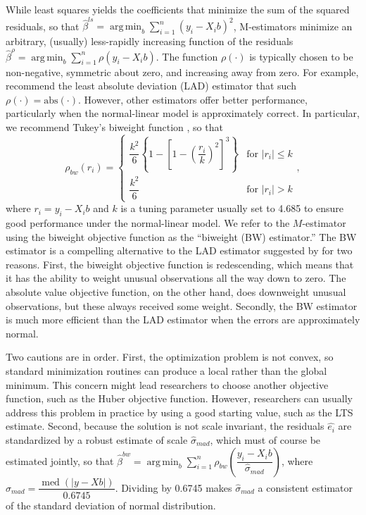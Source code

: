 \documentclass[12pt]{article}
\DeclareMathOperator*{\argmin}{arg\,min}
\DeclareMathOperator{\med}{med}
\begin{document}
While least squares yields the coefficients that minimize the sum of the squared residuals, so that $\hat{\beta}^{ls} =\argmin_{b} \sum_{i = 1}^n (y_i - X_ib)^2$, M-estimators minimize an arbitrary, (usually) less-rapidly increasing function of the residuals $\hat{\beta}^{\rho} =\argmin_{b} \sum_{i = 1}^n \rho(y_i - X_ib)$. 
The function $\rho(\cdot)$ is typically chosen to be non-negative, symmetric about zero, and increasing away from zero. 
For example, \cite{HardenDesmarais2011} recommend the least absolute deviation (LAD) estimator \citep{Dodge1987} that such $\rho(\cdot) = \text{abs}(\cdot)$. 
However, other estimators offer better performance, particularly when the normal-linear model is approximately correct. 
In particular, we recommend Tukey's biweight function \citep{BeatonTukey1974}, so that
\begin{displaymath}
   \rho_{bw}(r_i) = \left\{
     \begin{array}{lr}
       \dfrac{k^2}{6}\left\{ 1 - \left[ 1 - \left( \dfrac{r_i}{k} \right)^2 \right]^3\right\} & \text{for } |r_i| \leq k\\
        \dfrac{k^2}{6} & \text{for } |r_i| > k 
\end{array}
   \right.,
\end{displaymath}
\noindent where $r_i = y_i - X_ib$ and $k$ is a tuning parameter usually set to 4.685 to ensure good performance under the normal-linear model. 
We refer to the $M$-estimator using the biweight objective function as the ``biweight (BW) estimator.'' 
The BW estimator is a compelling alternative to the LAD estimator suggested by \cite{HardenDesmarais2011} for two reasons. 
First, the biweight objective function is redescending, which means that it has the ability to weight unusual observations all the way down to zero. 
The absolute value objective function, on the other hand, does downweight unusual observations, but these always received some weight. 
Secondly, the BW estimator is much more efficient than the LAD estimator when the errors are approximately normal. 

Two cautions are in order. 
First, the optimization problem is not convex, so standard minimization routines can produce a local rather than the global minimum. 
This concern might lead researchers to choose another objective function, such as the Huber objective function.
However, researchers can usually address this problem in practice by using a good starting value, such as the LTS estimate. 
Second, because the solution is not scale invariant, the residuals $\hat{e_i}$ are standardized by a robust estimate of scale $\hat{\sigma}_{mad}$, which must of course be estimated jointly, so that $\hat{\beta}^{bw} =\argmin_{b} \sum_{i = 1}^n \rho_{bw}\left(\dfrac{y_i - X_ib}{\hat{\sigma}_{mad}}\right)$, where $\hat{\sigma}_{mad} = \dfrac{\med\left( |y - Xb | \right)}{0.6745}$. 
Dividing by 0.6745 makes $\hat{\sigma}_{mad}$ a consistent estimator of the standard deviation of normal distribution.
\end{document}
